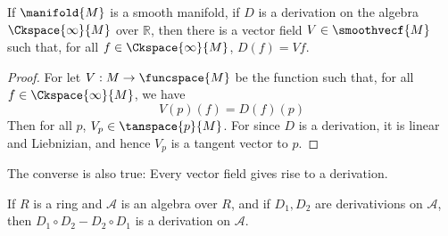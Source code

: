 \documentclass{article}                                                        %
\begin{document}
            \begin{theorem}
                If $\manifold{M}$ is a smooth manifold, if $D$ is a derivation
                on the algebra $\Ckspace{\infty}{M}$ over $\mathbb{R}$,
                then there is a vector field $V\in\smoothvecf{M}$ such that,
                for all $f\in\Ckspace{\infty}{M}$, $D(f)=Vf$.
            \end{theorem}
            \begin{proof}
                For let $V:M\rightarrow\funcspace{M}$ be the function such that,
                for all $f\in\Ckspace{\infty}{M}$, we have
                \begin{equation}
                    V(p)(f)=D(f)(p)
                \end{equation}
                Then for all $p$, $V_{p}\in\tanspace{p}{M}$. For since $D$ is a
                derivation, it is linear and Liebnizian, and hence $V_{p}$ is a
                tangent vector to $p$.
            \end{proof}
            The converse is also true: Every vector field gives rise to a
            derivation.
            \begin{theorem}
                If $R$ is a ring and $\mathscr{A}$ is an algebra over $R$,
                and if $D_{1},D_{2}$ are derivativions on $\mathscr{A}$, then
                $D_{1}\circ{D}_{2}-D_{2}\circ{D}_{1}$ is a derivation on
                $\mathscr{A}$.
            \end{theorem}
\end{document}
